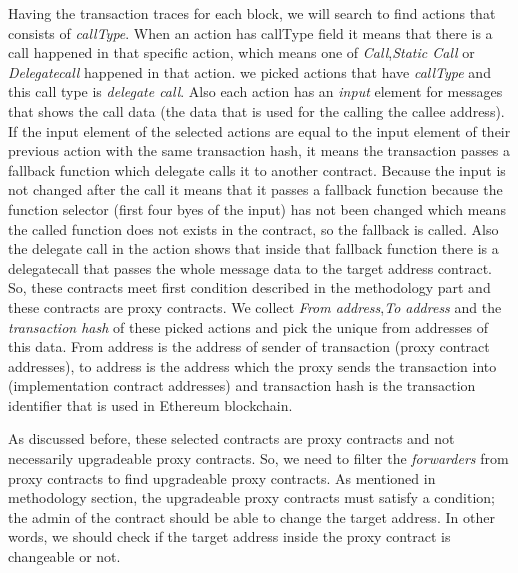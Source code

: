 Having the transaction traces for each block, we will search to find actions that consists of \textit{callType}. When an action has callType field it means that there is a call happened in that specific action, which means one of \textit{Call},\textit{Static Call} or \textit{Delegatecall} happened in that action. we picked actions that have \textit{callType} and this call type is \textit{delegate call}. Also each action has an \textit{input} element for messages that shows the call data (the data that is used for the calling the callee address). 
If the input element of the selected actions are equal to the input element of their previous action with the same transaction hash, it means the transaction passes a fallback function which delegate calls it to another contract. 
Because the input is not changed after the call it means that it passes a fallback function because the function selector (first four byes of the input) has not been changed which means the called function does not exists in the contract, so the fallback is called. Also the delegate call in the action shows that inside that fallback function there is a delegatecall that passes the whole message data to the target address contract. So, these contracts meet first condition described in the methodology part and these contracts are proxy contracts. We collect \textit{From address},\textit{To address} and the \textit{transaction hash} of these picked actions and pick the unique from addresses of this data. From address is the address of sender of transaction (proxy contract addresses), to address is the address which the proxy sends the transaction into (implementation contract addresses) and transaction hash is the transaction identifier that is used in Ethereum blockchain. 

As discussed before, these selected contracts are proxy contracts and not necessarily upgradeable proxy contracts. So, we need to filter the \textit{forwarders} from proxy contracts to find upgradeable proxy contracts. As mentioned in methodology section, the upgradeable proxy contracts must satisfy a condition; the admin of the contract should be able to change the target address. In other words, we should check if the target address inside the proxy contract is changeable or not.

